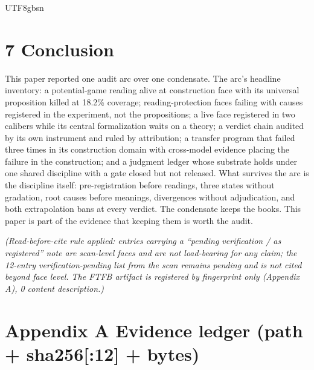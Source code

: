 \documentclass[11pt,letterpaper]{article}
\begin{document}
\begin{CJK}{UTF8}{gbsn}
\section*{7 Conclusion}

This paper reported one audit arc over one condensate. The arc's headline inventory: a potential-game reading alive at construction face with its universal proposition killed at 18.2\% coverage; reading-protection faces failing with causes registered in the experiment, not the propositions; a live face registered in two calibers while its central formalization waits on a theory; a verdict chain audited by its own instrument and ruled by attribution; a transfer program that failed three times in its construction domain with cross-model evidence placing the failure in the construction; and a judgment ledger whose substrate holds under one shared discipline with a gate closed but not released. What survives the arc is the discipline itself: pre-registration before readings, three states without gradation, root causes before meanings, divergences without adjudication, and both extrapolation bans at every verdict. The condensate keeps the books. This paper is part of the evidence that keeping them is worth the audit.

\emph{(Read-before-cite rule applied: entries carrying a ``pending verification / as registered'' note are scan-level faces and are not load-bearing for any claim; the 12-entry verification-pending list from the scan remains pending and is not cited beyond face level. The FTFB artifact is registered by fingerprint only (Appendix A), 0 content description.)}

\section*{Appendix A \textemdash{} Evidence ledger (path + sha256[:12] + bytes)}


\end{CJK}
\end{document}
